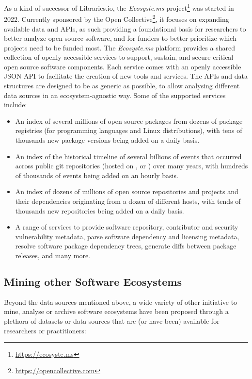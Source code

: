 As a kind of successor of Libraries.io, the \emph{Ecosyste.ms} project\footnote{\url{https://ecosyste.ms}} was started in 2022. Currently sponsored by the Open Collective\footnote{\url{https://opencollective.com}}, it focuses on expanding available data and APIs, as such providing a foundational basis for researchers to better analyze open source software, and for funders to better prioritize which projects need to be funded most.
The \emph{Ecosyste.ms} platform provides a shared collection of openly accessible services to support, sustain, and secure critical open source software components.
Each service comes with an openly accessible JSON API to facilitate the creation of new tools and services. The APIs and data structures are designed to be as generic as possible, to allow analysing different data sources in an ecosystem-agnostic way.
Some of the supported services include:
\begin{itemize}
    \item An index of several millions of open source packages from dozens of package registries (for programming languages and Linux distributions), with tens of thousands new package versions being added on a daily basis.
    \item An index of the historical timeline of several billions of events that occurred across public git repositories (hosted on \github, \gitlab or \gitea) over many years, with hundreds of thousands of events being added on an hourly basis.
    \item An index of dozens of millions of open source repositories and \docker projects and their dependencies originating from a dozen of different hosts, with tends of thousands new repositories being added on a daily basis.
    \item A range of services to provide software repository, contributor and security vulnerability metadata, parse software dependency and licensing metadata, resolve software package dependency trees, generate diffs between package releases, and many more.
\end{itemize}



\subsection{Mining other Software Ecosystems}

Beyond the data sources mentioned above, a wide variety of other initiative to mine, analyse or archive software ecosystems have been proposed through a plethora of datasets or data sources that are (or have been) available for researchers or practitioners:


